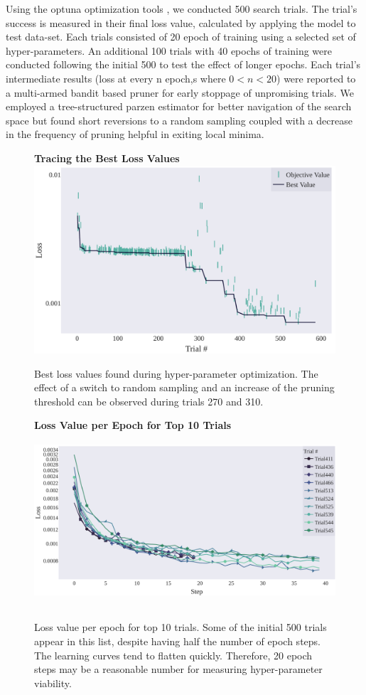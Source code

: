 \documentclass[\main/thesis.tex]{subfiles}
\begin{document}
Using the optuna optimization tools \cite{akiba2019optuna}, we conducted 500 search trials. The trial's success is measured in their final loss value, calculated by applying the model to test data-set. Each trials consisted of 20 epoch of training using a selected set of hyper-parameters. An additional 100 trials with 40 epochs of training were conducted following the initial 500 to test the effect of longer epochs. Each trial's intermediate results (loss at every n epoch,s where $0<n<20$) were reported to a multi-armed bandit based pruner for early stoppage of unpromising trials\cite{li2017hyperband}. We employed a tree-structured parzen estimator for better navigation of the search space \cite{bergstra2011algorithms,akiba2019optuna} but found short reversions to a random sampling coupled with a decrease in the frequency of pruning helpful in exiting local minima. \\
\begin{figure}[htbp]
\centering
\textbf{Tracing the Best Loss Values}
\includegraphics[width=12cm,height=7cm]{images/chapter_3/Optimization_History.pdf}
\caption{Best loss values found during hyper-parameter optimization. The effect of a switch to random sampling and an increase of the pruning threshold can be observed during trials 270 and 310.}
\label{chap3:bestvalues}
\end{figure}

\begin{figure}[htbp]
\centering
\textbf{Loss Value per Epoch for Top 10 Trials}
\includegraphics[width=12cm,height=6.5cm]{images/chapter_3/loss_per_training.pdf}
\caption{Loss value per epoch for top 10 trials. Some of the initial 500 trials appear in this list, despite having half the number of epoch steps. The learning curves tend to flatten quickly. Therefore, 20 epoch steps may be a reasonable number for measuring hyper-parameter viability. }
\label{chap3:top10}
\end{figure}
\end{document}
